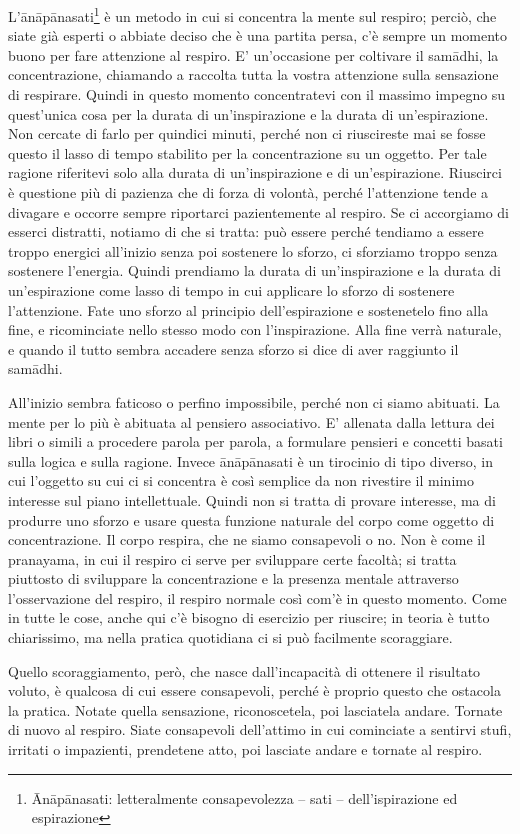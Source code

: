 
L'ānāpānasati\footnote{Ānāpānasati: letteralmente consapevolezza – sati –
dell'ispirazione ed espirazione} è un metodo in cui si concentra la mente sul
respiro; perciò, che siate già esperti o abbiate deciso che è una
partita persa, c'è sempre un momento buono per fare attenzione al
respiro. E' un'occasione per coltivare il samādhi, la concentrazione,
chiamando a raccolta tutta la vostra attenzione sulla sensazione di
respirare. Quindi in questo momento concentratevi con il massimo impegno
su quest'unica cosa per la durata di un'inspirazione e la durata di
un'espirazione. Non cercate di farlo per quindici minuti, perché non ci
riuscireste mai se fosse questo il lasso di tempo stabilito per la
concentrazione su un oggetto. Per tale ragione riferitevi solo alla
durata di un'inspirazione e di un'espirazione.
Riuscirci è questione più di pazienza che di forza di volontà, perché
l'attenzione tende a divagare e occorre sempre riportarci pazientemente
al respiro. Se ci accorgiamo di esserci distratti, notiamo di che si
tratta: può essere perché tendiamo a essere troppo energici all'inizio
senza poi sostenere lo sforzo, ci sforziamo troppo senza sostenere
l'energia. Quindi prendiamo la durata di un'inspirazione e la durata di
un'espirazione come lasso di tempo in cui applicare lo sforzo di
sostenere l'attenzione. Fate uno sforzo al principio dell'espirazione e
sostenetelo fino alla fine, e ricominciate nello stesso modo con
l'inspirazione. Alla fine verrà naturale, e quando il tutto sembra
accadere senza sforzo si dice di aver raggiunto il samādhi.

All'inizio sembra faticoso o perfino impossibile, perché non ci siamo
abituati. La mente per lo più è abituata al pensiero associativo. E'
allenata dalla lettura dei libri o simili a procedere parola per parola,
a formulare pensieri e concetti basati sulla logica e sulla ragione.
Invece ānāpānasati è un tirocinio di tipo diverso, in cui l'oggetto su
cui ci si concentra è così semplice da non rivestire il minimo interesse
sul piano intellettuale. Quindi non si tratta di provare interesse, ma
di produrre uno sforzo e usare questa funzione naturale del corpo come
oggetto di concentrazione. Il corpo respira, che ne siamo consapevoli o
no. Non è come il pranayama, in cui il respiro ci serve per sviluppare
certe facoltà; si tratta piuttosto di sviluppare la concentrazione e la
presenza mentale attraverso l'osservazione del respiro, il respiro
normale così com'è in questo momento. Come in tutte le cose, anche qui
c'è bisogno di esercizio per riuscire; in teoria è tutto chiarissimo, ma
nella pratica quotidiana ci si può facilmente scoraggiare.

Quello scoraggiamento, però, che nasce dall'incapacità di ottenere il
risultato voluto, è qualcosa di cui essere consapevoli, perché è proprio
questo che ostacola la pratica. Notate quella sensazione, riconoscetela,
poi lasciatela andare. Tornate di nuovo al respiro. Siate consapevoli
dell'attimo in cui cominciate a sentirvi stufi, irritati o impazienti,
prendetene atto, poi lasciate andare e tornate al respiro.

